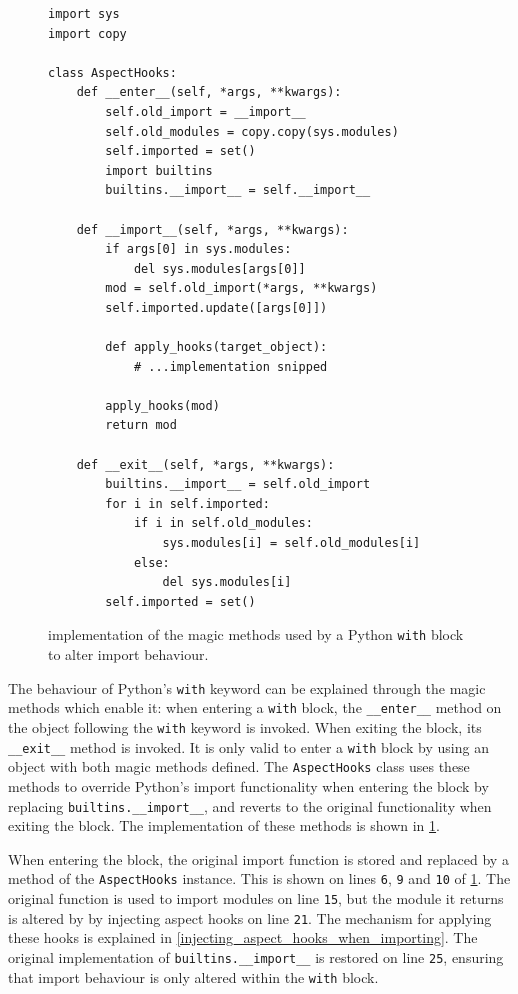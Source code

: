 \begin{figure}
    \centering
    \begin{lstlisting}[style=footnotesize_python]
import sys
import copy

class AspectHooks:
    def __enter__(self, *args, **kwargs):
        self.old_import = __import__
        self.old_modules = copy.copy(sys.modules)
        self.imported = set()
        import builtins
        builtins.__import__ = self.__import__

    def __import__(self, *args, **kwargs):
        if args[0] in sys.modules:
            del sys.modules[args[0]]
        mod = self.old_import(*args, **kwargs)
        self.imported.update([args[0]])
        
        def apply_hooks(target_object):
            # ...implementation snipped

        apply_hooks(mod)
        return mod

    def __exit__(self, *args, **kwargs):
        builtins.__import__ = self.old_import
        for i in self.imported:
            if i in self.old_modules:
                sys.modules[i] = self.old_modules[i]
            else:
                del sys.modules[i]
        self.imported = set()
    \end{lstlisting}
    \caption{\pdsf{} implementation of the magic methods used by a Python
    \lstinline{with} block to alter import behaviour.}
    \label{fig:aspecthooksmagicmethodswith}
\end{figure}


The behaviour of Python's \lstinline{with} keyword can be explained through the magic
methods which enable it: when entering a \lstinline{with} block, the
\lstinline{__enter__} method on the object
following the \lstinline{with} keyword is invoked. When exiting the block, its
\lstinline{__exit__} method is invoked. It is only valid to enter a
\lstinline{with} block by using an object with both magic methods defined. The
\lstinline{AspectHooks} class uses these methods to override Python's import
functionality when entering the block by replacing
\lstinline{builtins.__import__}, and reverts to the original functionality when
exiting the block. The implementation of these methods is shown in
\cref{fig:aspecthooksmagicmethodswith}.

When entering the block, the original import function is stored and replaced by
a method of the \lstinline{AspectHooks} instance. This is shown on lines
\texttt{6}, \texttt{9} and \texttt{10} of
\cref{fig:aspecthooksmagicmethodswith}. The original function is used to
import modules on line \texttt{15}, but the module it returns is altered by
\pdsf{} by injecting aspect hooks on line \texttt{21}. The mechanism for
applying these hooks is explained in \cref{injecting_aspect_hooks_when_importing}.
The original implementation of \lstinline{builtins.__import__} is restored on
line \texttt{25}, ensuring that import behaviour is only altered within the
\lstinline{with} block.


